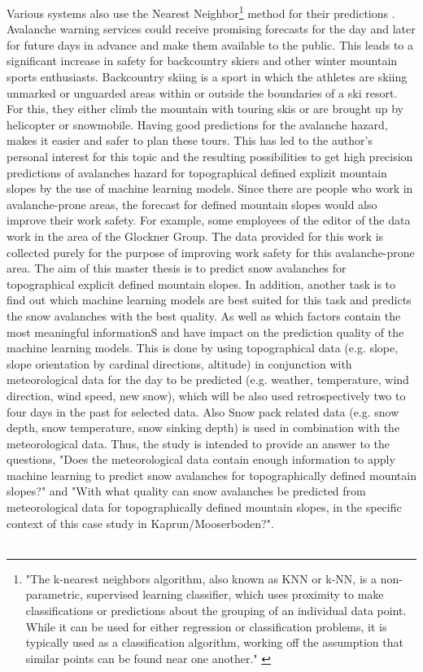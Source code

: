 \documentclass[../masterarbeit.tex]{subfiles}
\begin{document}
Various systems also use the Nearest Neighbor\footnote{"The k-nearest neighbors algorithm, also known as KNN or k-NN, is a non-parametric, supervised learning classifier, which uses proximity to make classifications or predictions about the grouping of an individual data point. While it can be used for either regression or classification problems, it is typically used as a classification algorithm, working off the assumption that similar points can be found near one another." \autocite[]{ibm-Nearest-Neighbors:2022} } method for their predictions \textcite[]{Pozdnoukhov:2008}.
Avalanche warning services could receive promising forecasts for the day and later for future days in advance and make them available to the public. This leads to a significant increase in safety for backcountry skiers and other winter mountain sports enthusiasts.
Backcountry skiing is a sport in which the athletes are skiing unmarked or unguarded areas within or outside the boundaries of a ski resort. For this, they either climb the mountain with touring skis or are brought up by helicopter or snowmobile. Having good predictions for the avalanche hazard, makes it easier and safer to plan these tours. This has led to the author's personal interest for this topic and the resulting possibilities to get high precision predictions of avalanches hazard for topographical defined explizit mountain slopes by the use of machine learning models.
Since there are people who work in avalanche-prone areas, the forecast for defined mountain slopes would also improve their work safety.  For example, some employees of the editor of the data work in the area of the Glockner Group. The data provided for this work is collected purely for the purpose of improving work safety for this avalanche-prone area.
\newline
\newline
The aim of this master thesis is to predict snow avalanches for topographical explicit defined mountain slopes. In addition, another task is to find out which machine learning models are best suited for this task and predicts the snow avalanches with the best quality. As well as which factors contain the most meaningful informationS and have impact on the prediction quality of the machine learning models.  This is done by using topographical data (e.g. slope, slope orientation by cardinal directions, altitude) in conjunction with meteorological data for the day to be predicted (e.g. weather, temperature, wind direction, wind speed, new snow), which will be also used retrospectively two to four days in the past for selected data. Also Snow pack related data (e.g. snow depth, snow temperature, snow sinking depth) is used in combination with the meteorological data. Thus, the study is intended to provide an answer to the questions, "Does the meteorological data contain enough information to apply machine learning to predict snow avalanches for topographically defined mountain slopes?" and "With what quality can snow avalanches be predicted from meteorological data for topographically defined mountain slopes, in the specific context of this case study in Kaprun/Mooserboden?". \\~\\
\end{document}
